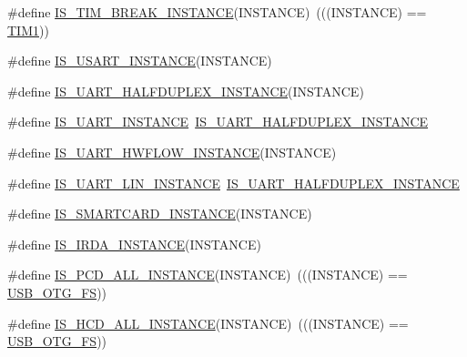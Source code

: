 \begin{DoxyCompactItemize}
\#define \hyperlink{group___exported__macros_ga68b8d9ca22720c9034753c604d83500d}{I\+S\+\_\+\+T\+I\+M\+\_\+\+B\+R\+E\+A\+K\+\_\+\+I\+N\+S\+T\+A\+N\+CE}(I\+N\+S\+T\+A\+N\+CE)~(((I\+N\+S\+T\+A\+N\+CE) == \hyperlink{group___peripheral__declaration_ga2e87451fea8dc9380056d3cfc5ed81fb}{T\+I\+M1}))
\item 
\#define \hyperlink{group___exported__macros_gafbce654f84a7c994817453695ac91cbe}{I\+S\+\_\+\+U\+S\+A\+R\+T\+\_\+\+I\+N\+S\+T\+A\+N\+CE}(I\+N\+S\+T\+A\+N\+CE)
\item 
\#define \hyperlink{group___exported__macros_ga69c4aa0c561c4c39c621710fbbb0cb7b}{I\+S\+\_\+\+U\+A\+R\+T\+\_\+\+H\+A\+L\+F\+D\+U\+P\+L\+E\+X\+\_\+\+I\+N\+S\+T\+A\+N\+CE}(I\+N\+S\+T\+A\+N\+CE)
\item 
\#define \hyperlink{group___exported__macros_ga14e4b19f7c750110f6c27cf26347ba45}{I\+S\+\_\+\+U\+A\+R\+T\+\_\+\+I\+N\+S\+T\+A\+N\+CE}~\hyperlink{group___exported__macros_ga69c4aa0c561c4c39c621710fbbb0cb7b}{I\+S\+\_\+\+U\+A\+R\+T\+\_\+\+H\+A\+L\+F\+D\+U\+P\+L\+E\+X\+\_\+\+I\+N\+S\+T\+A\+N\+CE}
\item 
\#define \hyperlink{group___exported__macros_gaf9a11d0720f3efa780126414a4ac50ad}{I\+S\+\_\+\+U\+A\+R\+T\+\_\+\+H\+W\+F\+L\+O\+W\+\_\+\+I\+N\+S\+T\+A\+N\+CE}(I\+N\+S\+T\+A\+N\+CE)
\item 
\#define \hyperlink{group___exported__macros_gaf7905bb5a02acf0e92ddf40bdd8dcdc0}{I\+S\+\_\+\+U\+A\+R\+T\+\_\+\+L\+I\+N\+\_\+\+I\+N\+S\+T\+A\+N\+CE}~\hyperlink{group___exported__macros_ga69c4aa0c561c4c39c621710fbbb0cb7b}{I\+S\+\_\+\+U\+A\+R\+T\+\_\+\+H\+A\+L\+F\+D\+U\+P\+L\+E\+X\+\_\+\+I\+N\+S\+T\+A\+N\+CE}
\item 
\#define \hyperlink{group___exported__macros_gab2734c105403831749ccb34eeb058988}{I\+S\+\_\+\+S\+M\+A\+R\+T\+C\+A\+R\+D\+\_\+\+I\+N\+S\+T\+A\+N\+CE}(I\+N\+S\+T\+A\+N\+CE)
\item 
\#define \hyperlink{group___exported__macros_ga98ae6698dc54d8441fce553a65bf5429}{I\+S\+\_\+\+I\+R\+D\+A\+\_\+\+I\+N\+S\+T\+A\+N\+CE}(I\+N\+S\+T\+A\+N\+CE)
\item 
\#define \hyperlink{group___exported__macros_gadaf663c55446f04fa69ee912b8890b32}{I\+S\+\_\+\+P\+C\+D\+\_\+\+A\+L\+L\+\_\+\+I\+N\+S\+T\+A\+N\+CE}(I\+N\+S\+T\+A\+N\+CE)~(((I\+N\+S\+T\+A\+N\+CE) == \hyperlink{group___peripheral__declaration_ga9ebb053ee138fb47cdfede0e3371123d}{U\+S\+B\+\_\+\+O\+T\+G\+\_\+\+FS}))
\item 
\#define \hyperlink{group___exported__macros_ga6696ebd1aea007a19e831517f3e1f497}{I\+S\+\_\+\+H\+C\+D\+\_\+\+A\+L\+L\+\_\+\+I\+N\+S\+T\+A\+N\+CE}(I\+N\+S\+T\+A\+N\+CE)~(((I\+N\+S\+T\+A\+N\+CE) == \hyperlink{group___peripheral__declaration_ga9ebb053ee138fb47cdfede0e3371123d}{U\+S\+B\+\_\+\+O\+T\+G\+\_\+\+FS}))

\end{DoxyCompactItemize}
